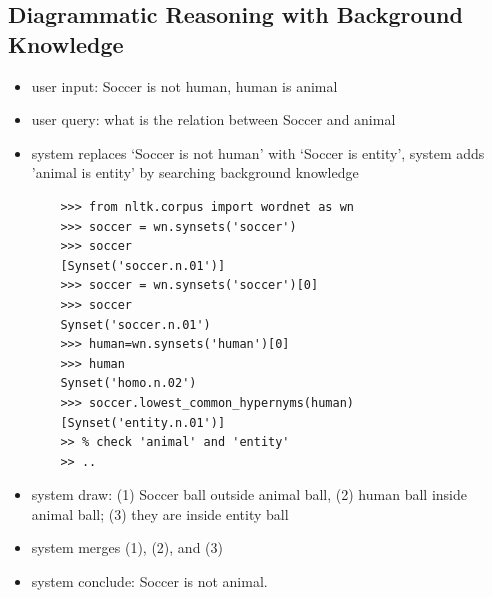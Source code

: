 \documentclass[]{article}
\begin{document}
\subsection{Diagrammatic Reasoning with Background Knowledge} 
\begin{itemize}
	\item user input: Soccer is not human, human is animal
	\item  user query: what is the relation between Soccer and animal
	\item  system replaces `Soccer is not human' with `Soccer is entity', system adds 'animal is entity' by searching background knowledge
	\begin{verbatim}
	>>> from nltk.corpus import wordnet as wn
	>>> soccer = wn.synsets('soccer')
	>>> soccer
	[Synset('soccer.n.01')]
	>>> soccer = wn.synsets('soccer')[0]
	>>> soccer
	Synset('soccer.n.01')
	>>> human=wn.synsets('human')[0]
	>>> human
	Synset('homo.n.02') 
	>>> soccer.lowest_common_hypernyms(human)
	[Synset('entity.n.01')] 
	>> % check 'animal' and 'entity'
	>> ..
	\end{verbatim}
	\item  system draw: (1) Soccer ball outside animal ball, (2) human ball inside animal ball; (3) they are inside entity ball 
	\item system merges (1), (2), and (3)  
	\item system conclude: Soccer is not animal.
\end{itemize}
\end{document}
